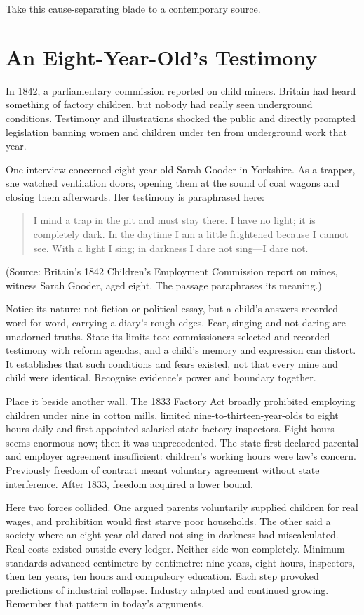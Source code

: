 Take this cause-separating blade to a contemporary source.

\section{An Eight-Year-Old's Testimony}
In 1842, a parliamentary commission reported on child miners. Britain had heard something of factory children, but nobody had really seen underground conditions. Testimony and illustrations shocked the public and directly prompted legislation banning women and children under ten from underground work that year.

One interview concerned eight-year-old Sarah Gooder in Yorkshire. As a trapper, she watched ventilation doors, opening them at the sound of coal wagons and closing them afterwards. Her testimony is paraphrased here:

\begin{quote}
I mind a trap in the pit and must stay there. I have no light; it is completely dark. In the daytime I am a little frightened because I cannot see. With a light I sing; in darkness I dare not sing---I dare not.
\end{quote}
(Source: Britain's 1842 Children's Employment Commission report on mines, witness Sarah Gooder, aged eight. The passage paraphrases its meaning.)

Notice its nature: not fiction or political essay, but a child's answers recorded word for word, carrying a diary's rough edges. Fear, singing and not daring are unadorned truths. State its limits too: commissioners selected and recorded testimony with reform agendas, and a child's memory and expression can distort. It establishes that such conditions and fears existed, not that every mine and child were identical. Recognise evidence's power and boundary together.

Place it beside another wall. The 1833 Factory Act broadly prohibited employing children under nine in cotton mills, limited nine-to-thirteen-year-olds to eight hours daily and first appointed salaried state factory inspectors. Eight hours seems enormous now; then it was unprecedented. The state first declared parental and employer agreement insufficient: children's working hours were law's concern. Previously freedom of contract meant voluntary agreement without state interference. After 1833, freedom acquired a lower bound.

Here two forces collided. One argued parents voluntarily supplied children for real wages, and prohibition would first starve poor households. The other said a society where an eight-year-old dared not sing in darkness had miscalculated. Real costs existed outside every ledger. Neither side won completely. Minimum standards advanced centimetre by centimetre: nine years, eight hours, inspectors, then ten years, ten hours and compulsory education. Each step provoked predictions of industrial collapse. Industry adapted and continued growing. Remember that pattern in today's arguments.


